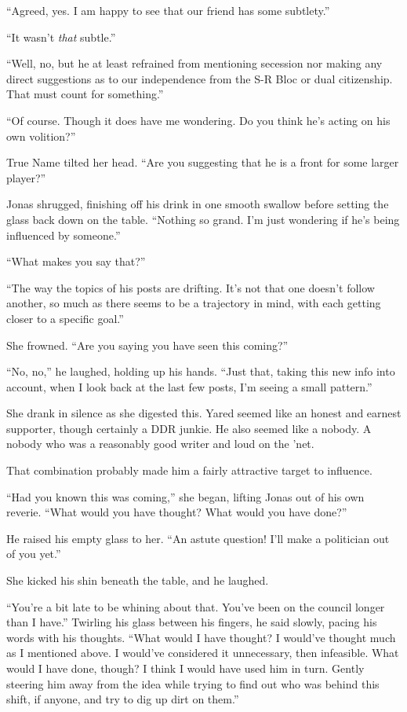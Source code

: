 ``Agreed, yes. I am happy to see that our friend has some subtlety.''

``It wasn't \emph{that} subtle.''

``Well, no, but he at least refrained from mentioning secession nor making any direct suggestions as to our independence from the S-R Bloc or dual citizenship. That must count for something.''

``Of course. Though it does have me wondering. Do you think he's acting on his own volition?''

True Name tilted her head. ``Are you suggesting that he is a front for some larger player?''

Jonas shrugged, finishing off his drink in one smooth swallow before setting the glass back down on the table. ``Nothing so grand. I'm just wondering if he's being influenced by someone.''

``What makes you say that?''

``The way the topics of his posts are drifting. It's not that one doesn't follow another, so much as there seems to be a trajectory in mind, with each getting closer to a specific goal.''

She frowned. ``Are you saying you have seen this coming?''

``No, no,'' he laughed, holding up his hands. ``Just that, taking this new info into account, when I look back at the last few posts, I'm seeing a small pattern.''

She drank in silence as she digested this. Yared seemed like an honest and earnest supporter, though certainly a DDR junkie. He also seemed like a nobody. A nobody who was a reasonably good writer and loud on the 'net.

That combination probably made him a fairly attractive target to influence.

``Had you known this was coming,'' she began, lifting Jonas out of his own reverie. ``What would you have thought? What would you have done?''

He raised his empty glass to her. ``An astute question! I'll make a politician out of you yet.''

She kicked his shin beneath the table, and he laughed.

``You're a bit late to be whining about that. You've been on the council longer than I have.'' Twirling his glass between his fingers, he said slowly, pacing his words with his thoughts. ``What would I have thought? I would've thought much as I mentioned above. I would've considered it unnecessary, then infeasible. What would I have done, though? I think I would have used him in turn. Gently steering him away from the idea while trying to find out who was behind this shift, if anyone, and try to dig up dirt on them.''

